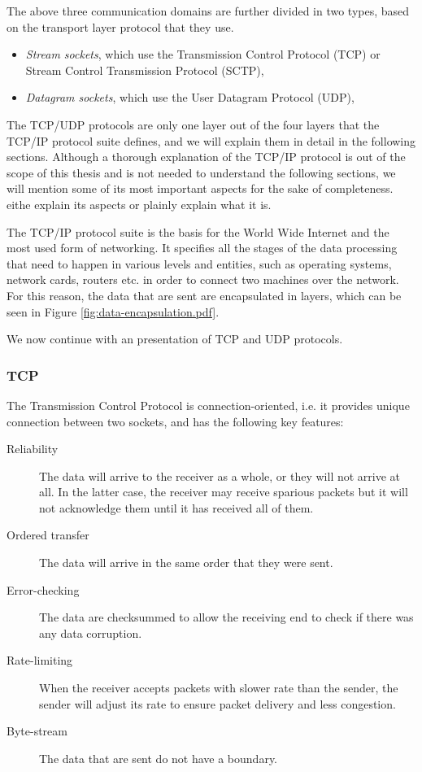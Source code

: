 The above three communication domains are further divided in two types, based 
on the transport layer protocol that they use.

\begin{itemize}
	\item \textit{Stream sockets}, which use the Transmission Control 
		Protocol (TCP) or Stream Control Transmission Protocol (SCTP),
	\item \textit{Datagram sockets}, which use the User Datagram Protocol 
		(UDP),
\end{itemize}

The TCP/UDP protocols are only one layer out of the four layers that the TCP/IP 
protocol suite defines, and we will explain them in detail in the following 
sections. Although a thorough explanation of the TCP/IP protocol is out of the 
scope of this thesis and is not needed to understand the following sections, we 
will mention some of its most important aspects for the sake of completeness.  
\fixme eithe explain its aspects or plainly explain what it is.

The TCP/IP protocol suite is the basis for the World Wide Internet and the most 
used form of networking. It specifies all the stages of the data processing 
that need to happen in various levels and entities, such as operating systems, 
network cards, routers etc. in order to connect two machines over the network.  
For this reason, the data that are sent are encapsulated in layers, which can 
be seen in Figure \ref{fig:data-encapsulation.pdf}.


We now continue with an presentation of TCP and UDP protocols.

\subsubsection{TCP}

The Transmission Control Protocol is connection-oriented, i.e. it provides 
unique connection between two sockets, and has the following key features:

\begin{description}
	\item[Reliability] The data will arrive to the receiver as a whole, or 
		they will not arrive at all. In the latter case, the receiver 
		may receive sparious packets but it will not acknowledge them 
		until it has received all of them.
	\item[Ordered transfer] The data will arrive in the same order that 
		they were sent.
	\item[Error-checking] The data are checksummed to allow the receiving 
		end to check if there was any data corruption.
	\item[Rate-limiting] When the receiver accepts packets with slower rate 
		than the sender, the sender will adjust its rate to ensure 
		packet delivery and less congestion.
	\item[Byte-stream] The data that are sent do not have a boundary.
\end{description}

